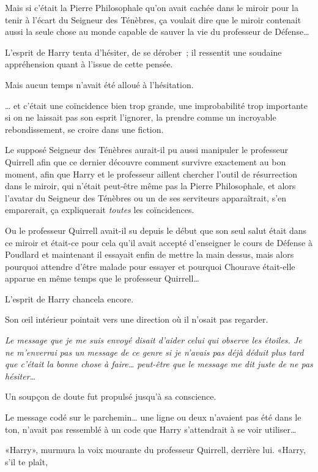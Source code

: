 Mais si c'était la Pierre Philosophale qu'on avait cachée dans le miroir pour la tenir à l'écart du Seigneur des Ténèbres, ça voulait dire que le miroir contenait aussi la seule chose au monde capable de sauver la vie du professeur de Défense…

L'esprit de Harry tenta d'hésiter, de se dérober~; il ressentit une soudaine appréhension quant à l'issue de cette pensée.

Mais aucun temps n'avait été alloué à l'hésitation.

… et c'était une coïncidence bien trop grande, une improbabilité trop importante si on ne laissait pas son esprit l'ignorer, la prendre comme un incroyable rebondissement, se croire dans une fiction.

Le supposé Seigneur des Ténèbres aurait-il pu aussi manipuler le professeur Quirrell afin que ce dernier découvre comment survivre exactement au bon moment, afin que Harry et le professeur aillent chercher l'outil de résurrection dans le miroir, qui n'était peut-être même pas la Pierre Philosophale, et alors l'avatar du Seigneur des Ténèbres ou un de ses serviteurs apparaîtrait, s'en emparerait, ça expliquerait \emph{toutes} les coïncidences.

Ou le professeur Quirrell avait-il su depuis le début que son seul salut était dans ce miroir et était-ce pour cela qu'il avait accepté d'enseigner le cours de Défense à Poudlard et maintenant il essayait enfin de mettre la main dessus, mais alors pourquoi attendre d'être malade pour essayer et pourquoi Chourave était-elle apparue en même temps que le professeur Quirrell…

L'esprit de Harry chancela encore.

Son œil intérieur pointait vers une direction où il n'osait pas regarder.

\emph{Le message que je me suis envoyé disait d'aider celui qui observe les étoiles. Je ne m'enverrai pas un message de ce genre si je n'avais pas déjà déduit plus tard que c'était la bonne chose à faire… peut-être que le message me dit juste de ne pas hésiter…}

Un soupçon de doute fut propulsé jusqu'à sa conscience.

Le message codé sur le parchemin… une ligne ou deux n'avaient pas été dans le ton, n'avait pas ressemblé à un code que Harry s'attendrait à se voir utiliser…

«Harry», murmura la voix mourante du professeur Quirrell, derrière lui. «Harry, s'il te plaît,

